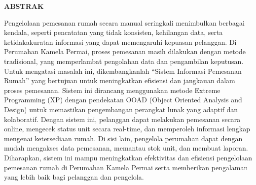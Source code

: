 %


%
\fontsize{12}{14.4}
\begin{center}\MakeUppercase{\textbf{Abstrak}}\end{center}

\noindent
\fontsize{10pt}{12pt}\selectfont
Pengelolaan pemesanan rumah secara manual seringkali menimbulkan berbagai kendala, seperti pencatatan yang tidak konsisten, kehilangan data, serta ketidakakuratan informasi yang dapat memengaruhi kepuasan pelanggan. Di Perumahan Kamela Permai, proses pemesanan masih dilakukan dengan metode tradisional, yang memperlambat pengolahan data dan pengambilan keputusan. Untuk mengatasi masalah ini, dikembangkanlah “Sistem Informasi Pemesanan Rumah” yang bertujuan untuk meningkatkan efisiensi dan jangkauan dalam proses pemesanan. Sistem ini dirancang menggunakan metode Extreme Programming (XP) dengan pendekatan OOAD (Object Oriented Analysis and Design) untuk memastikan pengembangan perangkat lunak yang adaptif dan kolaboratif. Dengan sistem ini, pelanggan dapat melakukan pemesanan secara online, mengecek status unit secara real-time, dan memperoleh informasi lengkap mengenai ketersediaan rumah. Di sisi lain, pengelola perumahan dapat dengan mudah mengakses data pemesanan, memantau stok unit, dan membuat laporan. Diharapkan, sistem ini mampu meningkatkan efektivitas dan efisiensi pengelolaan pemesanan rumah di Perumahan Kamela Permai serta memberikan pengalaman yang lebih baik bagi pelanggan dan pengelola.\\
\\
